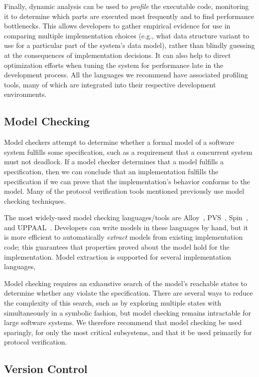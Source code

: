 Finally, dynamic analysis can be used to \emph{profile} the executable
code, monitoring it to determine which parts are executed most
frequently and to find performance bottlenecks. This allows developers
to gather empirical evidence for use in comparing multiple
implementation choices (e.g., what data structure variant to use for a
particular part of the system's data model), rather than blindly
guessing at the consequences of implementation decisions. It can also
help to direct optimization efforts when tuning the system for
performance late in the development process. All the languages we
recommend have associated profiling tools, many of which are
integrated into their respective development environments.

\subsection{Model Checking}

Model checkers attempt to determine whether a formal model of a
software system fulfills some specification, such as a requirement
that a concurrent system must not deadlock. If a model checker
determines that a model fulfills a specification, then we can conclude
that an implementation fulfills the specification if we can prove that
the implementation's behavior conforms to the model. Many of the
protocol verification tools mentioned previously use model checking
techniques.

The most widely-used model checking languages/tools are
Alloy~\cite{Alloy}, PVS~\cite{PVS}, Spin~\cite{Spin}, and
UPPAAL~\cite{UPPAAL}. Developers can write models in these languages
by hand, but it is more efficient to automatically \emph{extract}
models from existing implementation code; this guarantees that
properties proved about the model hold for the implementation. Model
extraction is supported for several implementation languages,

Model checking requires an exhaustive search of the model's reachable
states to determine whether any violate the specification. There are
several ways to reduce the complexity of this search, such as by
exploring multiple states with simultaneously in a symbolic fashion,
but model checking remains intractable for large software systems. We
therefore recommend that model checking be used sparingly, for only
the most critical subsystems, and that it be used primarily for
protocol verification.

\subsection{Version Control}

